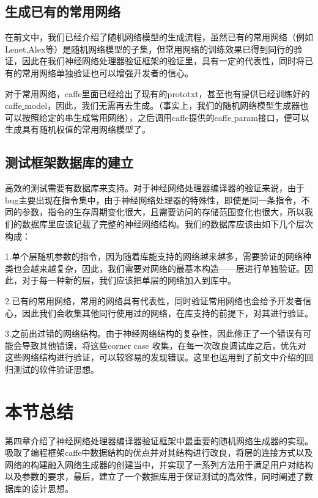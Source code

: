 \subsection{生成已有的常用网络}
在前文中，我们已经介绍了随机网络模型的生成流程，虽然已有的常用网络（例如Lenet,Alex等）是随机网络模型的子集，但常用网络的训练效果已得到同行的验证，因此在我们神经网络处理器验证框架的验证里，具有一定的代表性，同时将已有的常用网络单独验证也可以增强开发者的信心。

对于常用网络，caffe里面已经给出了现有的prototxt，甚至也有提供已经训练好的caffe\underline{ }model，因此，我们无需再去生成。（事实上，我们的随机网络模型生成器也可以按照给定的串生成常用网络），之后调用caffe提供的caffe\underline{ }param接口，便可以生成具有随机权值的常用网络模型了。

\subsection{测试框架数据库的建立}
高效的测试需要有数据库来支持。对于神经网络处理器编译器的验证来说，由于bug主要出现在指令集中，由于神经网络处理器的特殊性，即使是同一条指令，不同的参数，指令的生存周期变化很大，且需要访问的存储范围变化也很大，所以我们的数据库里应该记载了完整的神经网络结构。我们的数据库应该由如下几个层次构成：

1.单个层随机参数的指令，因为随着库能支持的网络越来越多，需要验证的网络种类也会越来越复杂，因此，我们需要对网络的最基本构造——层进行单独验证。因此，对于每一种新的层，我们应该把单层的网络加入到库中。

2.已有的常用网络，常用的网络具有代表性，同时验证常用网络也会给予开发者信心，因此我们会收集其他同行使用过的网络，在库支持的前提下，对其进行验证。

3.之前出过错的网络结构。由于神经网络结构的复杂性，因此修正了一个错误有可能会导致其他错误，将这些corner case 收集，在每一次改良调试库之后，优先对这些网络结构进行验证，可以较容易的发现错误。这里也运用到了前文中介绍的回归测试的软件验证思想。
\section{本节总结}
第四章介绍了神经网络处理器编译器验证框架中最重要的随机网络生成器的实现。吸取了编程框架caffe中数据结构的优点并对其结构进行改良，将层的连接方式以及网络的构建融入网络生成器的创建当中，并实现了一系列方法用于满足用户对结构以及参数的要求，最后，建立了一个数据库用于保证测试的高效性，同时阐述了数据库的设计思想。